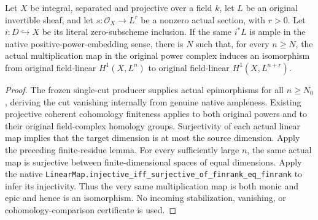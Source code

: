 \begin{theorem}
\label{thm:seshadri-actual-single-cut-eventual-hone-iso}
\leanok
Let $X$ be integral, separated and projective over a field $k$, let $L$
be an original invertible sheaf, and let $s:\mathcal O_X\to L^r$ be a
nonzero actual section, with $r>0$. Let $i:D\hookrightarrow X$ be its
literal zero-subscheme inclusion. If the same $i^*L$ is ample in the native
positive-power-embedding sense, there is $N$ such that, for every
$n\geq N$, the actual multiplication map in the original power complex
induces an isomorphism from original field-linear $H^1(X,L^n)$ to
original field-linear $H^1(X,L^{n+r})$.
\end{theorem}
\begin{proof}
The frozen single-cut producer supplies actual epimorphisms for all
$n\geq N_0$, deriving the cut vanishing internally from genuine native
ampleness. Existing projective coherent cohomology finiteness applies to
both original powers and to their original field-complex homology groups.
Surjectivity of each actual linear map implies that the target dimension
is at most the source dimension. Apply the preceding finite-residue lemma.
For every sufficiently large $n$, the same actual map is surjective between
finite-dimensional spaces of equal dimensions. Apply the native
\nolinkurl{LinearMap.injective_iff_surjective_of_finrank_eq_finrank}
to infer its injectivity. Thus the very same multiplication map is both
monic and epic and hence is an isomorphism. No incoming stabilization,
vanishing, or cohomology-comparison certificate is used.
\end{proof}

